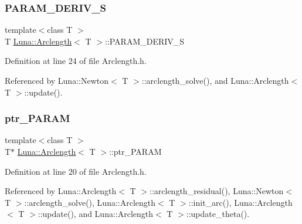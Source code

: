\mbox{\label{classLuna_1_1Arclength_a5a02856595774b4a96e4d8add5d9baa4}} 
\subsubsection{\texorpdfstring{P\+A\+R\+A\+M\+\_\+\+D\+E\+R\+I\+V\+\_\+S}{PARAM\_DERIV\_S}}
{\footnotesize\ttfamily template$<$class T $>$ \\
T \hyperlink{classLuna_1_1Arclength}{Luna\+::\+Arclength}$<$ T $>$\+::P\+A\+R\+A\+M\+\_\+\+D\+E\+R\+I\+V\+\_\+S\hspace{0.3cm}{\ttfamily [protected]}}



Definition at line 24 of file Arclength.\+h.



Referenced by Luna\+::\+Newton$<$ T $>$\+::arclength\+\_\+solve(), and Luna\+::\+Arclength$<$ T $>$\+::update().

\mbox{\label{classLuna_1_1Arclength_a984cead721a38abf1ab2a489052461e0}} 
\subsubsection{\texorpdfstring{ptr\+\_\+\+P\+A\+R\+AM}{ptr\_PARAM}}
{\footnotesize\ttfamily template$<$class T $>$ \\
T$\ast$ \hyperlink{classLuna_1_1Arclength}{Luna\+::\+Arclength}$<$ T $>$\+::ptr\+\_\+\+P\+A\+R\+AM\hspace{0.3cm}{\ttfamily [protected]}}



Definition at line 20 of file Arclength.\+h.



Referenced by Luna\+::\+Arclength$<$ T $>$\+::arclength\+\_\+residual(), Luna\+::\+Newton$<$ T $>$\+::arclength\+\_\+solve(), Luna\+::\+Arclength$<$ T $>$\+::init\+\_\+arc(), Luna\+::\+Arclength$<$ T $>$\+::update(), and Luna\+::\+Arclength$<$ T $>$\+::update\+\_\+theta().

